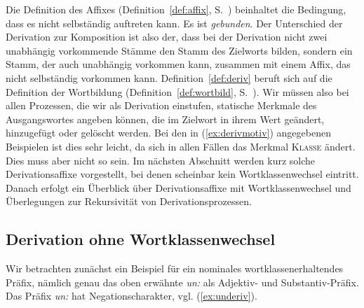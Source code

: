 
Die Definition des Affixes (Definition~\ref{def:affix}, S.~\pageref{def:affix}) beinhaltet die Bedingung, dass es nicht selbständig auftreten kann.
Es ist \textit{gebunden}.
Der Unterschied der Derivation zur Komposition ist also der, dass bei der Derivation nicht zwei unabhängig vorkommende Stämme den Stamm des Zielworts bilden, sondern ein Stamm, der auch unabhängig vorkommen kann, zusammen mit einem Affix, das nicht selbständig vorkommen kann.
Definition~\ref{def:deriv} beruft sich auf die Definition der Wortbildung (Definition~\ref{def:wortbild}, S.~\pageref{def:wortbild}).
Wir müssen also bei allen Prozessen, die wir als Derivation einstufen, statische Merkmale des Ausgangswortes angeben können, die im Zielwort in ihrem Wert geändert, hinzugefügt oder gelöscht werden.
Bei den in (\ref{ex:derivmotiv}) angegebenen Beispielen ist dies sehr leicht, da sich in allen Fällen das Merkmal \textsc{Klasse} ändert.
Dies muss aber nicht so sein.
Im nächsten Abschnitt werden kurz solche Derivationsaffixe vorgestellt, bei denen scheinbar kein Wortklassenwechsel eintritt.
Danach erfolgt ein Überblick über Derivationsaffixe mit Wortklassenwechsel und Überlegungen zur Rekursivität von Derivationsprozessen.

\subsection{Derivation ohne Wortklassenwechsel}

\label{sec:derivohnewaw}


Wir betrachten zunächst ein Beispiel für ein nominales wortklassenerhaltendes Präfix, nämlich genau das oben erwähnte \textit{un:} als Adjektiv- und Substantiv-Präfix.
Das Präfix \textit{un:} hat Negationscharakter, vgl. (\ref{ex:underiv}).

\begin{exe}
  \ex\label{ex:underiv}
  \begin{xlist}
  \end{xlist}
\end{exe}

